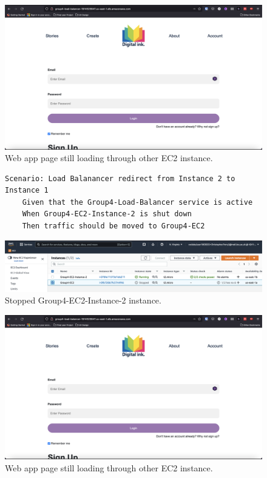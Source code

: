 \begin{figure}[!htbp]
    \centering
    \includegraphics[width=\textwidth]{resources/elb/elb-working}
    \caption{Web app page still loading through other EC2 instance.}
    \label{fig:elb-test-working}
\end{figure}

\clearpage

\begin{figure}[!htbp]
    \centering
    \begin{verbatim}
Scenario: Load Balanancer redirect from Instance 2 to Instance 1
    Given that the Group4-Load-Balancer service is active
    When Group4-EC2-Instance-2 is shut down
    Then traffic should be moved to Group4-EC2
    \end{verbatim}
    \label{fig:elb-test-2}
\end{figure}

\begin{figure}[!htbp]
    \centering
    \includegraphics[width=\textwidth]{resources/elb/elb-test-stopped-instance}
    \caption{Stopped Group4-EC2-Instance-2 instance.}
    \label{fig:elb-test-stopped-instance-2}
\end{figure}

\begin{figure}[!htbp]
    \centering
    \includegraphics[width=\textwidth]{resources/elb/elb-working}
    \caption{Web app page still loading through other EC2 instance.}
    \label{fig:elb-test-working-2}
\end{figure}



